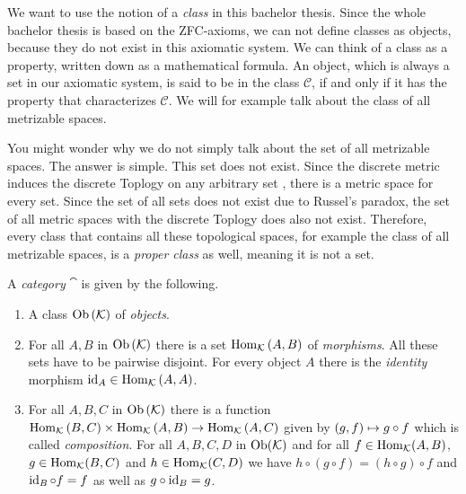 We want to use the notion of a \textit{class} in this bachelor thesis. Since the whole bachelor thesis is based on the ZFC-axioms, we can not define classes as objects, because they do not exist in this axiomatic system. We can think of a class as a property, written down as a mathematical formula. An object, which is always a set in our axiomatic system, is said to be in the class $\mathcal{C}$, if and only if it has the property that characterizes $\mathcal{C}$. We will for example talk about the class of all metrizable spaces. 

You might wonder why we do not simply talk about the set of all metrizable spaces. The answer is simple. This set does not exist. Since the discrete metric induces the discrete Toplogy on any arbitrary set \cite[p.414]{Ana1&2}, there is a metric space for every set. Since the set of all sets does not exist due to Russel's paradox, the set of all metric spaces with the discrete Toplogy does also not exist. Therefore, every class that contains all these topological spaces, for example the class of all metrizable spaces, is a \textit{proper class} as well, meaning it is not a set.

\begin{definition}
	A \textit{category} $\cat$ is given by the following.
	\begin{enumerate}
		\item A class $\operatorname{Ob}{\left ( \mathcal K \right )}$ of \textit{objects}.
		\item For all $A, B$ in $\operatorname{Ob}{\left ( \mathcal K \right )}$ there is a set $\operatorname{Hom}_\mathcal K{\left ( A, B \right )}$ of \textit{morphisms}. All these sets have to be pairwise disjoint. For every object $A$ there is the \textit{identity} morphism $\operatorname{id}_A \in \operatorname{Hom}_\mathcal K{\left ( A, A \right )}$.
		\item For all $A, B, C$ in $\operatorname{Ob}{\left ( \mathcal K \right )}$ there is a function $\operatorname{Hom}_\mathcal K{\left ( B, C \right )} \times \operatorname{Hom}_\mathcal K{\left ( A, B \right )} \to \operatorname{Hom}_\mathcal K{\left ( A, C \right )}$ given by ${\left ( g, f \right )} \mapsto g \circ f$ which is called \textit{composition}. For all $A, B, C, D$ in $\operatorname{Ob}(\mathcal K)$ and for all $f \in \operatorname{Hom}_\mathcal K(A, B)$, $g \in \operatorname{Hom}_\mathcal K(B,C)$ and $h \in \operatorname{Hom}_\mathcal K(C,D)$ we have $h \circ (g \circ f) = (h \circ g) \circ f$ and $\operatorname{id}_B \circ f = f$ as well as $g \circ \operatorname{id}_B = g$. 
	\end{enumerate}
\end{definition}

